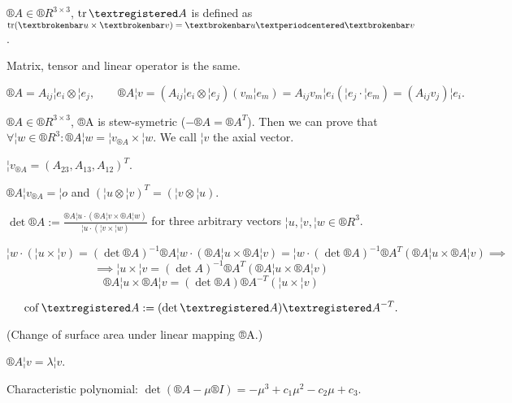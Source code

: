 \documentclass[12pt]{article}					%
\begin{document}
\begin{definice}
	$  ®A \in ®R^{3 \times 3}$, $\tr ®A$ is defined as $\tr (¦u \times ¦v) = ¦u·¦v$.
\end{definice}

\begin{poznamka}
	Matrix, tensor and linear operator is the same.

	$$ ®A = A_{ij} ¦e_i \otimes ¦e_j, \qquad ®A ¦v = (A_{ij} ¦e_i \otimes ¦e_j)(v_m¦e_m) = A_{ij} v_m ¦e_i(¦e_j · ¦e_m) = (A_{ij}v_j) ¦e_i. $$
\end{poznamka}

\begin{definice}
	$®A \in ®R^{3 \times 3}$, ®A is stew-symetric ($-®A = ®A^T$). Then we can prove that $\forall ¦w \in ®R^3: ®A ¦w = ¦v_{®A} \times ¦w$. We call $¦v$ the axial vector.

	\begin{poznamkain}
		$¦v_{®A} = (A_{23}, A_{13}, A_{12})^T$.
	\end{poznamkain}
\end{definice}

\begin{tvrzeni}
	$®A ¦v_{®A} = ¦o$ and $(¦u \otimes ¦v)^T = (¦v \otimes ¦u)$.
\end{tvrzeni}

\begin{definice}[Determinant in 3D]
	$\det ®A := \frac{®A ¦u · (®A ¦v \times ®A ¦w)}{¦u·(¦v \times ¦w)} $ for three arbitrary vectors $¦u, ¦v, ¦w \in ®R^3$.
\end{definice}

\begin{poznamka}
	$$ ¦w · (¦u \times ¦v) = (\det ®A)^{-1} ®A¦w · (®A¦u \times ®A ¦v) = ¦w · (\det ®A)^{-1} ®A^T (®A ¦u \times ®A ¦v) \implies $$
	$$ \implies ¦u \times ¦v = (\det A)^{-1} ®A^T (®A¦u \times ®A ¦v) $$
	$$ ®A ¦u \times ®A ¦v = (\det ®A) ®A^{-T} (¦u \times ¦v) $$
\end{poznamka}

\begin{definice}[Cofactor]
	$$ \cof ®A := (\det ®A)®A^{-T}. $$

	(Change of surface area under linear mapping ®A.)
\end{definice}

\begin{definice}
	$®A ¦v = \lambda ¦v$.

	Characteristic polynomial: $\det(®A - \mu ®I) = - \mu^3 + c_1\mu^2 - c_2 \mu + c_3$.
\end{definice}
\end{document}
